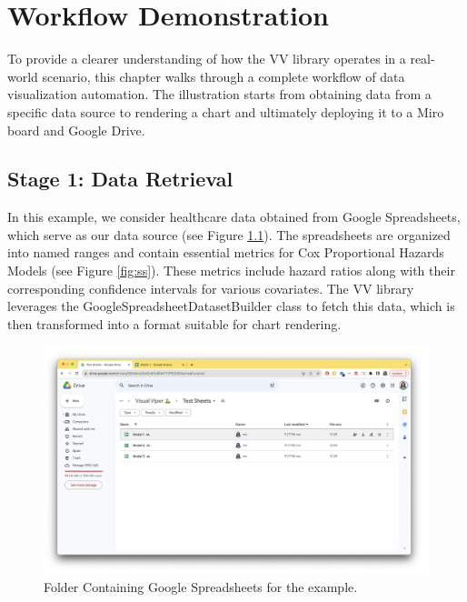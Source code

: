 \chapter{Workflow Demonstration}\label{workflow-demonstration}

\minitoc

To provide a clearer understanding of how the VV library operates in a
real-world scenario, this chapter walks through a complete workflow of
data visualization automation. The illustration starts from obtaining
data from a specific data source to rendering a chart and ultimately
deploying it to a Miro board and Google Drive.

\section{Stage 1: Data Retrieval}\label{stage-1-data-retrieval}

In this example, we consider healthcare data obtained from Google
Spreadsheets, which serve as our data source (see Figure \ref{fig:sheets_folder}). The
spreadsheets are organized into named ranges and contain essential
metrics for Cox Proportional Hazards Models (see Figure \ref{fig:ss}). These
metrics include hazard ratios along with their corresponding confidence
intervals for various covariates. The VV library leverages the
GoogleSpreadsheetDatasetBuilder class to fetch this data, which is then
transformed into a format suitable for chart rendering.

\begin{figure}[ht]
  \centering
  \includegraphics[width=\textwidth]{media/fig13.png}
  \caption{Folder Containing Google Spreadsheets for the example.}
  \label{fig:sheets_folder}
\end{figure}

